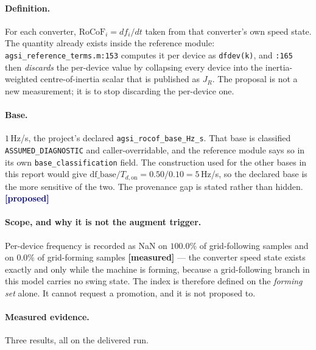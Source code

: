 \documentclass[12pt,a4paper]{article}
\theoremstyle{remark}
\newcommand{\code}[1]{\texttt{\small #1}}
\newcommand{\measured}{\textcolor{ok}{\textbf{[measured]}}}
\newcommand{\proposed}{\textcolor{navy}{\textbf{[proposed]}}}
\begin{document}
\paragraph{Definition.} For each converter, $\mathrm{RoCoF}_i = df_i/dt$ taken
from that converter's own speed state. The quantity already exists inside the
reference module: \code{agsi\_reference\_terms.m:153} computes it per device as
\code{dfdev(k)}, and \code{:165} then \emph{discards} the per-device value by
collapsing every device into the inertia-weighted centre-of-inertia scalar that
is published as $J_R$. The proposal is not a new measurement; it is to stop
discarding the per-device one.

\paragraph{Base.} $1$\,Hz/s, the project's declared
\code{agsi\_rocof\_base\_Hz\_s}. That base is classified
\code{ASSUMED\_DIAGNOSTIC} and caller-overridable, and the reference module says
so in its own \code{base\_classification} field. The construction used for the
other bases in this report would give
$\text{df\_base}/T_{d,\mathrm{on}} = 0.50/0.10 = 5$\,Hz/s, so the declared base is
the more sensitive of the two. The provenance gap is stated rather than hidden.
\proposed

\paragraph{Scope, and why it is not the augment trigger.} Per-device frequency is
recorded as NaN on $100.0\%$ of grid-following samples and on $0.0\%$ of
grid-forming samples \measured{} --- the converter speed state exists exactly and
only while the machine is forming, because a grid-following branch in this model
carries no swing state. The index is therefore defined on the \emph{forming set}
alone. It cannot request a promotion, and it is not proposed to.

\paragraph{Measured evidence.} Three results, all on the delivered run.
\end{document}
